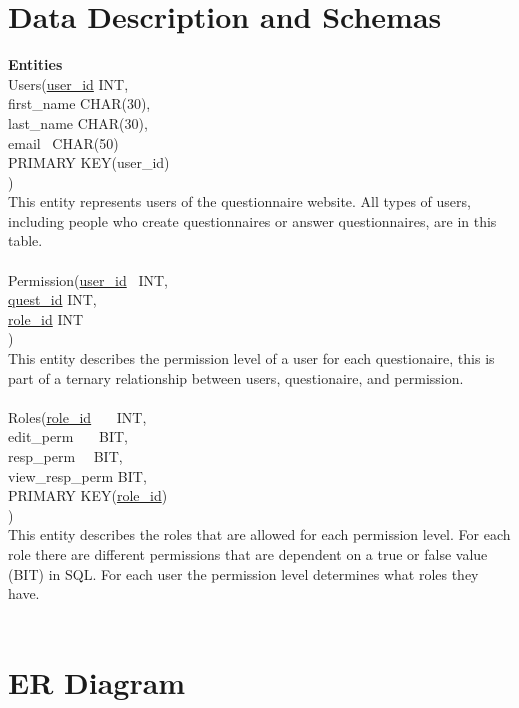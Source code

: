 \documentclass[12pt, oneside, a4paper]{article}
\begin{document}
    \section{Data Description and Schemas}
    \textbf{Entities}
    \\
    Users(\underline{user\_id} \indent\indent INT,\\
    \hphantom{Users(}first\_name \indent CHAR(30),\\
    \hphantom{Users(}last\_name \indent \thinspace CHAR(30),\\
    \hphantom{Users(}email \indent\indent\ \thinspace CHAR(50)\\
    \hphantom{Users(}PRIMARY KEY(user\_id)\\
    )
    \\
    This entity represents users of the questionnaire website.
    All types of users, including people who create questionnaires
    or answer questionnaires, are in this table.
    \\\\
    Permission(\underline{user\_id} \indent \ \thinspace INT,\\
    \hphantom{Permission(}\underline{quest\_id} \indent INT,\\
    \hphantom{Permission(}\underline{role\_id} \indent INT\\
    )
    \\
    This entity describes the permission level of a user for each 
    questionaire, this is part of a ternary relationship between users, questionaire, and permission.
    \\\\
    Roles(\underline{role\_id} \indent\indent\indent \ \ \ INT,\\
    \hphantom{Roles(}edit\_perm \indent\indent\ \ \ BIT,\\
    \hphantom{Roles(}resp\_perm \indent\indent\ \ \thinspace BIT,\\
    \hphantom{Roles(}view\_resp\_perm \indent BIT,\\
    \hphantom{Roles(}PRIMARY KEY(\underline{role\_id})\\
    )
    \\
    This entity describes the roles that are allowed for each permission level. For each role there are
    different permissions that are dependent on a true or false value (BIT) in SQL. For each user the 
    permission level determines what roles they have.
    \\\\
    \section{ER Diagram}
\end{document}
